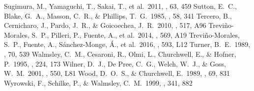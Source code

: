 \documentclass{aa}
\begin{document}
\begin{thebibliography}{}
 Sugimura, M., Yamaguchi, T., Sakai, T., et al.\ 2011, \pasj, 63, 459 
 Sutton, E.~C., Blake, G.~A., Masson, C.~R., \& Phillips, T.~G.\ 1985, \apjs, 58, 341 
 Tercero, B., Cernicharo, J., Pardo, J.~R., \& Goicoechea, J.~R.\ 2010, \aap, 517, A96 
 Trevi{\~n}o-Morales, S.~P., Pilleri, P., Fuente, A., et al.\ 2014, \aap, 569, A19 
 Trevi{\~n}o-Morales, S.~P., Fuente, A., S{\'a}nchez-Monge, {\'A}., et al.\ 2016, \aap, 593, L12 
 Turner, B.~E.\ 1989, \apjs, 70, 539 
 Walmsley, C.~M., Cesaroni, R., Olmi, L., Churchwell, E., \& Hofner, P.\ 1995, \apss, 224, 173 
 Wilner, D.~J., De Pree, C.~G., Welch, W.~J., \& Goss, W.~M.\ 2001, \apjl, 550, L81 
 Wood, D.~O.~S., \& Churchwell, E.\ 1989, \apjs, 69, 831 
 Wyrowski, F., Schilke, P., \& Walmsley, C.~M.\ 1999, \aap, 341, 882 
\end{thebibliography}
\end{document}
